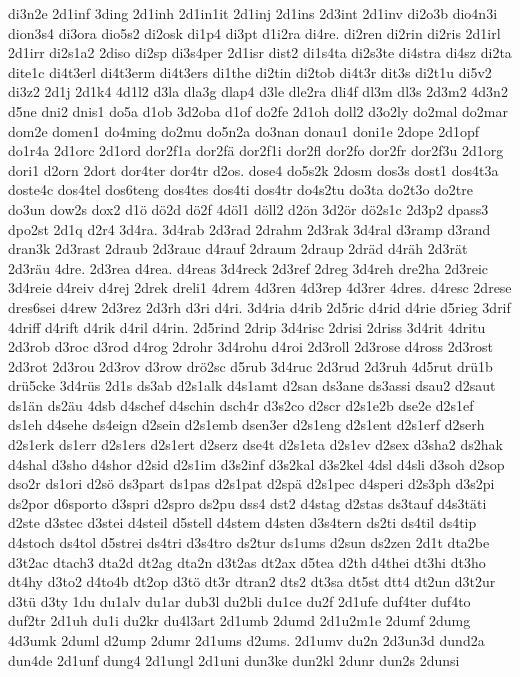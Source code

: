 {di3n2e
2d1inf
3ding
2d1inh
2d1in1it
2d1inj
2d1ins
2d3int
2d1inv
di2o3b
dio4n3i
dion3s4
di3ora
dio5s2
di2osk
di1p4
di3pt
d1i2ra
di4re.
di2ren
di2rin
di2ris
2d1irl
2d1irr
di2s1a2
2diso
di2sp
di3s4per
2d1isr
dist2
di1s4ta
di2s3te
di4stra
di4sz
di2ta
dite1c
di4t3erl
di4t3erm
di4t3ers
di1the
di2tin
di2tob
di4t3r
dit3s
di2t1u
di5v2
di3z2
2d1j
2d1k4
4d1l2
d3la
dla3g
dlap4
d3le
dle2ra
dli4f
dl3m
dl3s
2d3m2
4d3n2
d5ne
dni2
dnis1
do5a
d1ob
3d2oba
d1of
do2fe
2d1oh
doll2
d3o2ly
do2mal
do2mar
dom2e
domen1
do4ming
do2mu
do5n2a
do3nan
donau1
doni1e
2dope
2d1opf
do1r4a
2d1orc
2d1ord
dor2f1a
dor2fä
dor2f1i
dor2fl
dor2fo
dor2fr
dor2f3u
2d1org
dori1
d2orn
2dort
dor4ter
dor4tr
d2os.
dose4
do5s2k
2dosm
dos3s
dost1
dos4t3a
doste4c
dos4tel
dos6teng
dos4tes
dos4ti
dos4tr
do4s2tu
do3ta
do2t3o
do2tre
do3un
dow2s
dox2
d1ö
dö2d
dö2f
4döl1
döll2
d2ön
3d2ör
dö2s1c
2d3p2
dpass3
dpo2st
2d1q
d2r4
3d4ra.
3d4rab
2d3rad
2drahm
2d3rak
3d4ral
d3ramp
d3rand
dran3k
2d3rast
2draub
2d3rauc
d4rauf
2draum
2draup
2dräd
d4räh
2d3rät
2d3räu
4dre.
2d3rea
d4rea.
d4reas
3d4reck
2d3ref
2dreg
3d4reh
dre2ha
2d3reic
3d4reie
d4reiv
d4rej
2drek
dreli1
4drem
4d3ren
4d3rep
4d3rer
4dres.
d4resc
2drese
dres6sei
d4rew
2d3rez
2d3rh
d3ri
d4ri.
3d4ria
d4rib
2d5ric
d4rid
d4rie
d5rieg
3drif
4driff
d4rift
d4rik
d4ril
d4rin.
2d5rind
2drip
3d4risc
2drisi
2driss
3d4rit
4dritu
2d3rob
d3roc
d3rod
d4rog
2drohr
3d4rohu
d4roi
2d3roll
2d3rose
d4ross
2d3rost
2d3rot
2d3rou
2d3rov
d3row
drö2sc
d5rub
3d4ruc
2d3rud
2d3ruh
4d5rut
drü1b
drü5cke
3d4rüs
2d1s
ds3ab
d2s1alk
d4s1amt
d2san
ds3ane
ds3assi
dsau2
d2saut
ds1än
ds2äu
4dsb
d4schef
d4schin
dsch4r
d3s2co
d2scr
d2s1e2b
dse2e
d2s1ef
ds1eh
d4sehe
ds4eign
d2sein
d2s1emb
dsen3er
d2s1eng
d2s1ent
d2s1erf
d2serh
d2s1erk
ds1err
d2s1ers
d2s1ert
d2serz
dse4t
d2s1eta
d2s1ev
d2sex
d3sha2
ds2hak
d4shal
d3sho
d4shor
d2sid
d2s1im
d3s2inf
d3s2kal
d3s2kel
4dsl
d4sli
d3soh
d2sop
dso2r
ds1ori
d2sö
ds3part
ds1pas
d2s1pat
d2spä
d2s1pec
d4speri
d2s3ph
d3s2pi
ds2por
d6sporto
d3spri
d2spro
ds2pu
dss4
dst2
d4stag
d2stas
ds3tauf
d4s3täti
d2ste
d3stec
d3stei
d4steil
d5stell
d4stem
d4sten
d3s4tern
ds2ti
ds4til
ds4tip
d4stoch
ds4tol
d5strei
ds4tri
d3s4tro
ds2tur
ds1ums
d2sun
ds2zen
2d1t
dta2be
d3t2ac
dtach3
dta2d
dt2ag
dta2n
d3t2as
dt2ax
d5tea
d2th
d4thei
dt3hi
dt3ho
dt4hy
d3to2
d4to4b
dt2op
d3tö
dt3r
dtran2
dts2
dt3sa
dt5st
dtt4
dt2un
d3t2ur
d3tü
d3ty
1du
du1alv
du1ar
dub3l
du2bli
du1ce
du2f
2d1ufe
duf4ter
duf4to
duf2tr
2d1uh
du1i
du2kr
du4l3art
2d1umb
2dumd
2d1u2m1e
2dumf
2dumg
4d3umk
2duml
d2ump
2dumr
2d1ums
d2ums.
2d1umv
du2n
2d3un3d
dund2a
dun4de
2d1unf
dung4
2d1ungl
2d1uni
dun3ke
dun2kl
2dunr
dun2s
2dunsi
}
